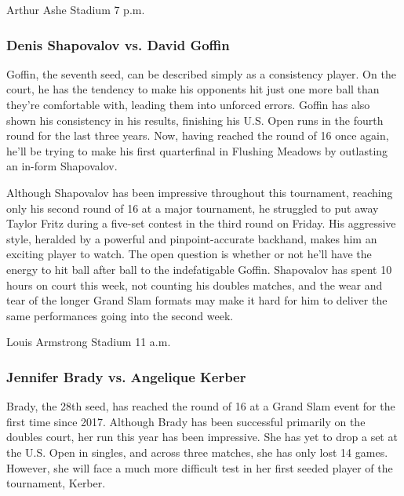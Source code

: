 Arthur Ashe Stadium \textbar{} 7 p.m.

\hypertarget{denis-shapovalov-vs-david-goffin}{%
\subsubsection{\texorpdfstring{\textbf{Denis Shapovalov vs. David
Goffin}}{Denis Shapovalov vs. David Goffin}}\label{denis-shapovalov-vs-david-goffin}}

Goffin, the seventh seed, can be described simply as a consistency
player. On the court, he has the tendency to make his opponents hit just
one more ball than they're comfortable with, leading them into unforced
errors. Goffin has also shown his consistency in his results, finishing
his U.S. Open runs in the fourth round for the last three years. Now,
having reached the round of 16 once again, he'll be trying to make his
first quarterfinal in Flushing Meadows by outlasting an in-form
Shapovalov.

Although Shapovalov has been impressive throughout this tournament,
reaching only his second round of 16 at a major tournament, he struggled
to put away Taylor Fritz during a five-set contest in the third round on
Friday. His aggressive style, heralded by a powerful and
pinpoint-accurate backhand, makes him an exciting player to watch. The
open question is whether or not he'll have the energy to hit ball after
ball to the indefatigable Goffin. Shapovalov has spent 10 hours on court
this week, not counting his doubles matches, and the wear and tear of
the longer Grand Slam formats may make it hard for him to deliver the
same performances going into the second week.

Louis Armstrong Stadium \textbar{} 11 a.m.

\hypertarget{jennifer-brady-vs-angelique-kerber}{%
\subsubsection{\texorpdfstring{\textbf{Jennifer Brady vs. Angelique
Kerber}}{Jennifer Brady vs. Angelique Kerber}}\label{jennifer-brady-vs-angelique-kerber}}

Brady, the 28th seed, has reached the round of 16 at a Grand Slam event
for the first time since 2017. Although Brady has been successful
primarily on the doubles court, her run this year has been impressive.
She has yet to drop a set at the U.S. Open in singles, and across three
matches, she has only lost 14 games. However, she will face a much more
difficult test in her first seeded player of the tournament, Kerber.

